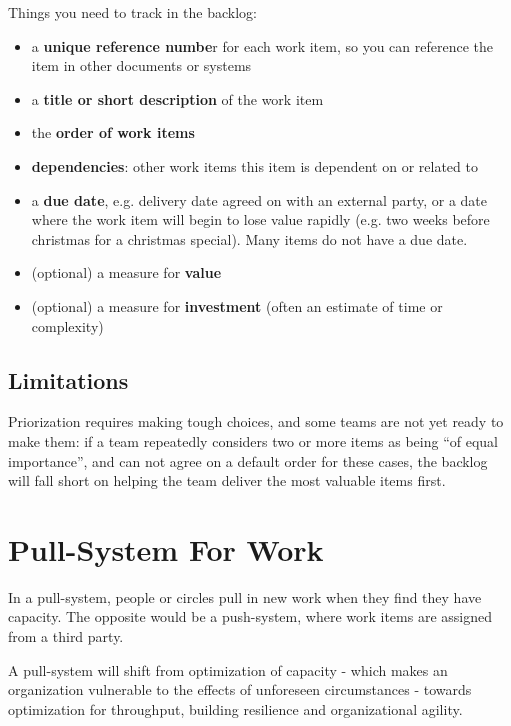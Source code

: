 Things you need to track in the backlog:

\begin{itemize}
\item a \textbf{unique reference numbe}r for each work item, so you can reference the item in other documents or systems

\item a \textbf{title or short description} of the work item

\item the \textbf{order of work items}

\item \textbf{dependencies}: other work items this item is dependent on or related to

\item a \textbf{due date}, e.g. delivery date agreed on with an external party, or a date where the work item will begin to lose value rapidly (e.g. two weeks before christmas for a christmas special). Many items do not have a due date.

\item (optional) a measure for \textbf{value}

\item (optional) a measure for \textbf{investment} (often an estimate of time or complexity)

\end{itemize}

\subsection{Limitations}
\label{limitations}

Priorization requires making tough choices, and some teams are not yet ready to make them: if a team repeatedly considers two or more items as being ``of equal importance'', and can not agree on a default order for these cases, the backlog will fall short on helping the team deliver the most valuable items first.

\section{Pull-System For Work}
\label{pull-systemforwork}

In a pull-system, people or circles pull in new work when they find they have capacity. The opposite would be a push-system, where work items are assigned from a third party.

A pull-system will shift from optimization of capacity - which makes an organization vulnerable to the effects of unforeseen circumstances - towards optimization for throughput, building resilience and organizational agility.

